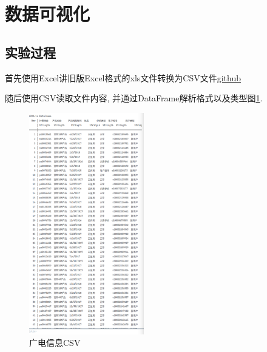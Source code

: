 \documentclass[a4paper]{article}
\begin{document}
\newpage
\section{数据可视化}\label{sub:ptx}
\subsection{实验过程} \label{sub:ptxproc}

首先使用Excel讲旧版Excel格式的xls文件转换为CSV文件\href{"https://github.com/lovebaihezi/lab/blob/main/data-process/lab1/julia/file/xian_guangdian.csv"}{github}

随后使用CSV读取文件内容, 并通过DataFrame解析格式以及类型图\ref{fig:csvinfo}. 

\begin{figure}[ht]
 \centering
 \includegraphics[width=5cm]{images/广电信息CSV展示.png}
 \caption{广电信息CSV}
 \label{fig:csvinfo}
\end{figure}
\end{document}
